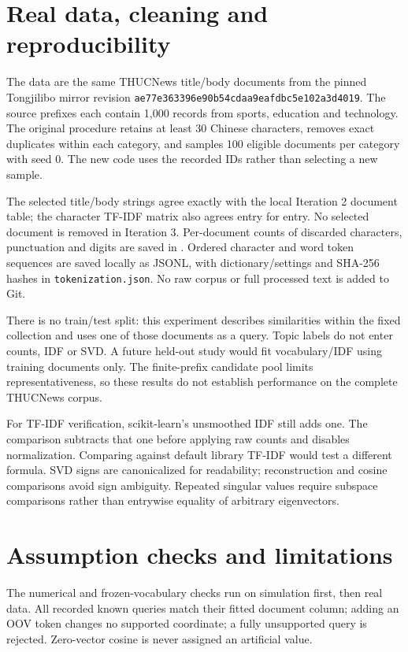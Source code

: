 \section{Real data, cleaning and reproducibility}
The data are the same THUCNews title/body documents from the pinned
Tongjilibo mirror revision
\texttt{ae77e363396e90b54cdaa9eafdbc5e102a3d4019}.
The source prefixes each contain 1,000 records from sports, education
and technology. The original procedure retains at least 30 Chinese
characters, removes exact duplicates within each category, and samples
100 eligible documents per category with seed 0.
The new code uses the recorded IDs rather than selecting a new sample.

The selected title/body strings agree exactly with the local Iteration 2
document table; the character TF-IDF matrix also agrees entry for entry.
No selected document is removed in Iteration 3.
Per-document counts of discarded characters, punctuation and digits
are saved in . Ordered character and word
token sequences are saved locally as JSONL, with dictionary/settings
and SHA-256 hashes in \texttt{tokenization.json}.
No raw corpus or full processed text is added to Git.

There is no train/test split: this experiment describes similarities
within the fixed collection and uses one of those documents as a
query. Topic labels do not enter counts, IDF or SVD. A future held-out
study would fit vocabulary/IDF using training documents only.
The finite-prefix candidate pool limits representativeness, so these
results do not establish performance on the complete THUCNews corpus.

For TF-IDF verification, scikit-learn's unsmoothed IDF still adds one.
The comparison subtracts that one before applying raw counts and
disables normalization. Comparing against default library TF-IDF
would test a different formula. SVD signs are canonicalized for
readability; reconstruction and cosine comparisons avoid sign ambiguity.
Repeated singular values require subspace comparisons rather than
entrywise equality of arbitrary eigenvectors.

\section{Assumption checks and limitations}
The numerical and frozen-vocabulary checks run on simulation first,
then real data. All recorded known queries match their fitted document
column; adding an OOV token changes no supported coordinate; a fully
unsupported query is rejected. Zero-vector cosine is never assigned
an artificial value.


